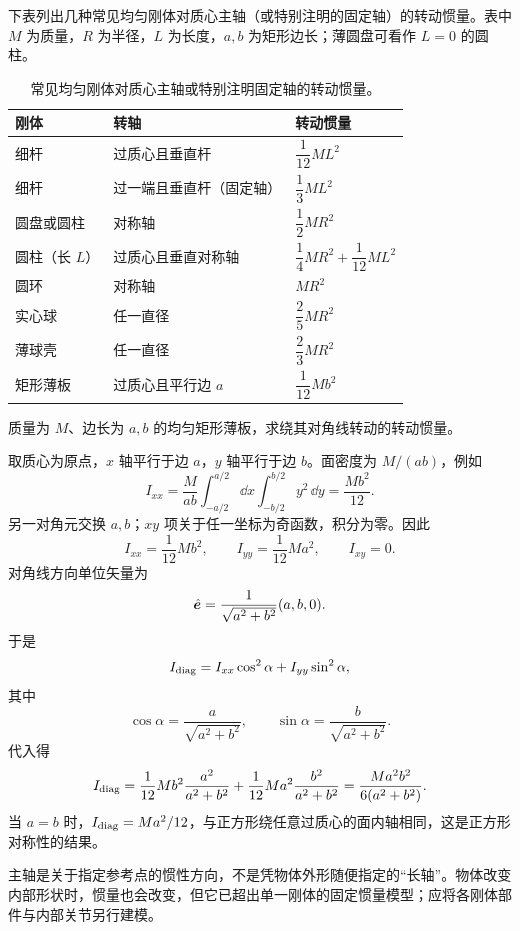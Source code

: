 下表列出几种常见均匀刚体对质心主轴（或特别注明的固定轴）的转动惯量。表中 \(M\) 为质量，\(R\) 为半径，\(L\) 为长度，\(a,b\) 为矩形边长；薄圆盘可看作 \(L=0\) 的圆柱。

\begin{table}[htbp]
\centering
\small
\begin{tabular}{lll}
\toprule
刚体 & 转轴 & 转动惯量 \\
\midrule
细杆 & 过质心且垂直杆 & \(\dfrac{1}{12}ML^2\) \\
细杆 & 过一端且垂直杆（固定轴） & \(\dfrac{1}{3}ML^2\) \\
圆盘或圆柱 & 对称轴 & \(\dfrac{1}{2}MR^2\) \\
圆柱（长 \(L\)） & 过质心且垂直对称轴 & \(\dfrac{1}{4}MR^2+\dfrac{1}{12}ML^2\) \\
圆环 & 对称轴 & \(MR^2\) \\
实心球 & 任一直径 & \(\dfrac{2}{5}MR^2\) \\
薄球壳 & 任一直径 & \(\dfrac{2}{3}MR^2\) \\
矩形薄板 & 过质心且平行边 \(a\) & \(\dfrac{1}{12}Mb^2\) \\
\bottomrule
\end{tabular}
\caption{常见均匀刚体对质心主轴或特别注明固定轴的转动惯量。}
\label{tab:inertia-moments}
\end{table}

\begin{example}[矩形薄板绕对角线转动]
质量为 \(M\)、边长为 \(a,b\) 的均匀矩形薄板，求绕其对角线转动的转动惯量。

取质心为原点，\(x\) 轴平行于边 \(a\)，\(y\) 轴平行于边 \(b\)。面密度为 $M/(ab)$，例如
\[
I_{xx}=\frac{M}{ab}\int_{-a/2}^{a/2}\dd x\int_{-b/2}^{b/2}y^2\,\dd y=\frac{Mb^2}{12}.
\]
另一对角元交换 $a,b$；$xy$ 项关于任一坐标为奇函数，积分为零。因此
\[
I_{xx}=\frac{1}{12}Mb^2,\qquad
I_{yy}=\frac{1}{12}Ma^2,\qquad
I_{xy}=0.
\]
对角线方向单位矢量为
\[
\hat{\boldsymbol{e}}=\frac{1}{\sqrt{a^2+b^2}}(a,b,0).
\]
于是
\[
I_{\rm diag}
=I_{xx}\cos^2\alpha+I_{yy}\sin^2\alpha,
\]
其中
\[
\cos\alpha=\frac{a}{\sqrt{a^2+b^2}},
\qquad
\sin\alpha=\frac{b}{\sqrt{a^2+b^2}}.
\]
代入得
\[
I_{\rm diag}
=\frac{1}{12}Mb^2\frac{a^2}{a^2+b^2}
+\frac{1}{12}Ma^2\frac{b^2}{a^2+b^2}
=\frac{Ma^2b^2}{6(a^2+b^2)}.
\]
当 \(a=b\) 时，\(I_{\rm diag}=Ma^2/12\)，与正方形绕任意过质心的面内轴相同，这是正方形对称性的结果。
\end{example}

\begin{physicsbox}
主轴是关于指定参考点的惯性方向，不是凭物体外形随便指定的“长轴”。物体改变内部形状时，惯量也会改变，但它已超出单一刚体的固定惯量模型；应将各刚体部件与内部关节另行建模。
\end{physicsbox}

